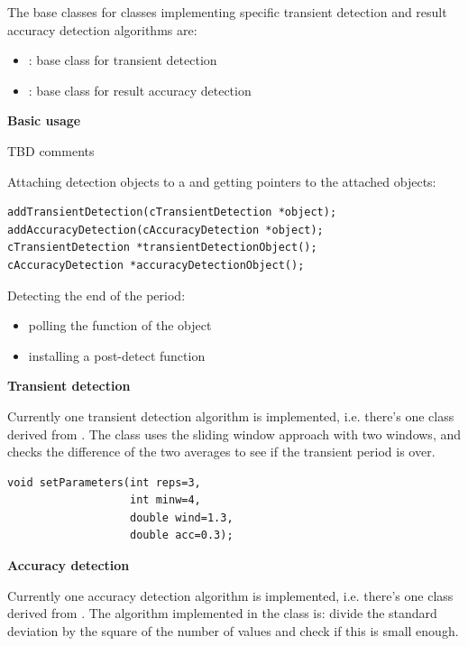 The base classes for classes implementing specific transient 
detection and result accuracy detection algorithms are:
\begin{itemize}
\item{: base class for transient detection}
\item{: base class for result accuracy detection}
\end{itemize}


\textbf{Basic usage}


TBD comments


Attaching detection objects to a  and getting pointers 
to the attached objects:

\begin{Verbatim}
addTransientDetection(cTransientDetection *object);
addAccuracyDetection(cAccuracyDetection *object);
cTransientDetection *transientDetectionObject();
cAccuracyDetection *accuracyDetectionObject(); 
\end{Verbatim}


Detecting the end of the period:
\begin{itemize}
\item{polling the  function of the object}
\item{installing a post-detect function}
\end{itemize}


\textbf{Transient detection}


Currently one transient detection algorithm
is implemented, i.e.  there's one class derived from
. The  class
uses the sliding window approach with two windows, and checks the
difference of the two averages to see if the transient period is over.

\begin{Verbatim}
void setParameters(int reps=3, 
                   int minw=4,
                   double wind=1.3, 
                   double acc=0.3);
\end{Verbatim}

\textbf{Accuracy detection}


Currently one accuracy detection algorithm
is implemented, i.e.  there's one class derived from
. The algorithm implemented in the
 class is: divide the standard deviation by the
square of the number of values and check if this is small enough.

